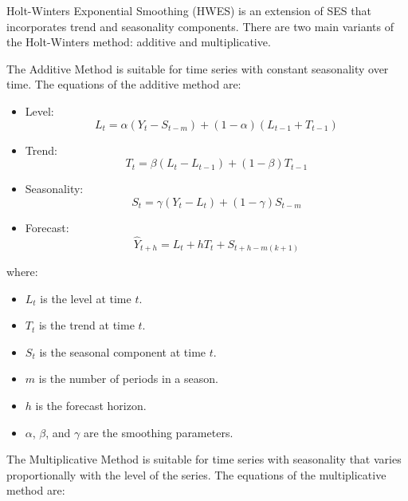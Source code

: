 Holt-Winters Exponential Smoothing (HWES) is an extension of SES that incorporates trend and seasonality components. There are two main variants of the Holt-Winters method: additive and multiplicative.

The Additive Method is suitable for time series with constant seasonality over time. The equations of the additive method are:

\begin{itemize}
    \item Level:
    \begin{equation}
    L_t = \alpha (Y_t - S_{t-m}) + (1-\alpha)(L_{t-1} + T_{t-1})
    \end{equation}
    \item Trend:
    \begin{equation}
    T_t = \beta (L_t - L_{t-1}) + (1-\beta) T_{t-1}
    \end{equation}
    \item Seasonality:
    \begin{equation}
    S_t = \gamma (Y_t - L_t) + (1-\gamma) S_{t-m}
    \end{equation}
    \item Forecast:
    \begin{equation}
    \hat{Y}_{t+h} = L_t + h T_t + S_{t+h-m(k+1)}
    \end{equation}
\end{itemize}

where:
\begin{itemize}
    \item \( L_t \) is the level at time \( t \).
    \item \( T_t \) is the trend at time \( t \).
    \item \( S_t \) is the seasonal component at time \( t \).
    \item \( m \) is the number of periods in a season.
    \item \( h \) is the forecast horizon.
    \item \( \alpha \), \( \beta \), and \( \gamma \) are the smoothing parameters.
\end{itemize}

The Multiplicative Method is suitable for time series with seasonality that varies proportionally with the level of the series. The equations of the multiplicative method are:

